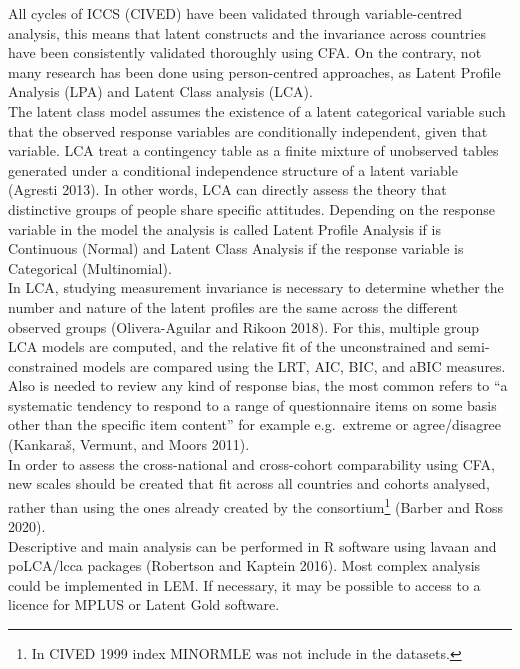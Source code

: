 \documentclass[
      11pt,
                      ]{article}
\begin{document}
All cycles of ICCS (CIVED) have been validated through variable-centred
analysis, this means that latent constructs and the invariance across
countries have been consistently validated thoroughly using CFA. On the
contrary, not many research has been done using person-centred
approaches, as Latent Profile Analysis (LPA) and Latent Class analysis
(LCA).\\
\newline  The latent class model assumes the existence of a latent
categorical variable such that the observed response variables are
conditionally independent, given that variable. LCA treat a contingency
table as a finite mixture of unobserved tables generated under a
conditional independence structure of a latent variable (Agresti 2013).
In other words, LCA can directly assess the theory that distinctive
groups of people share specific attitudes. Depending on the response
variable in the model the analysis is called Latent Profile Analysis if
is Continuous (Normal) and Latent Class Analysis if the response
variable is Categorical (Multinomial).\\
\newline  In LCA, studying measurement invariance is necessary to
determine whether the number and nature of the latent profiles are the
same across the different observed groups (Olivera-Aguilar and Rikoon
2018). For this, multiple group LCA models are computed, and the
relative fit of the unconstrained and semi-constrained models are
compared using the LRT, AIC, BIC, and aBIC measures. Also is needed to
review any kind of response bias, the most common refers to ``a
systematic tendency to respond to a range of questionnaire items on some
basis other than the specific item content'' for example e.g.~extreme or
agree/disagree (Kankaraš, Vermunt, and Moors 2011).\\
\newline  In order to assess the cross-national and cross-cohort
comparability using CFA, new scales should be created that fit across
all countries and cohorts analysed, rather than using the ones already
created by the consortium\footnote{In CIVED 1999 index MINORMLE was not
  include in the datasets.} (Barber and Ross 2020).\\
\newline  Descriptive and main analysis can be performed in R software
using lavaan and poLCA/lcca packages (Robertson and Kaptein 2016). Most
complex analysis could be implemented in LEM. If necessary, it may be
possible to access to a licence for MPLUS or Latent Gold software.
\end{document}
